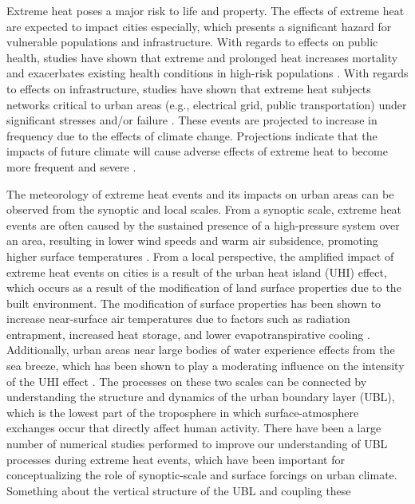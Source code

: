 \documentclass[num-refs]{wiley-article}
\begin{document}
Extreme heat poses a major risk to life and property. The effects of extreme heat are expected to impact cities especially, which presents a significant hazard for vulnerable populations and infrastructure. With regards to effects on public health, studies have shown that extreme and prolonged heat increases mortality and exacerbates existing health conditions in high-risk populations \citep{anderson2011, frumkin2016, heaviside2017, madrigano2015}. With regards to effects on infrastructure, studies have shown that extreme heat subjects networks critical to urban areas (e.g., electrical grid, public transportation) under significant stresses and/or failure \citep{mcevoy2012, zuo2015}. These events are projected to increase in frequency due to the effects of climate change. Projections indicate that the impacts of future climate will cause adverse effects of extreme heat to become more frequent and severe \citep{burillo2019, forzieri2018, peng2011}.

The meteorology of extreme heat events and its impacts on urban areas can be observed from the synoptic and local scales. From a synoptic scale, extreme heat events are often caused by the sustained presence of a high-pressure system over an area, resulting in lower wind speeds and warm air subsidence, promoting higher surface temperatures \citep{black2004, miralles2014}. From a local perspective, the amplified impact of extreme heat events on cities is a result of the urban heat island (UHI) effect, which occurs as a result of the modification of land surface properties due to the built environment. The modification of surface properties has been shown to increase near-surface air temperatures due to factors such as radiation entrapment, increased heat storage, and lower evapotranspirative cooling \citep{chen2014, li2013, ramamurthy2017, zhao2018}. Additionally, urban areas near large bodies of water experience effects from the sea breeze, which has been shown to play a moderating influence on the intensity of the UHI effect \citep{hu2016, jiang2019, stefanon2014}. The processes on these two scales can be connected by understanding the structure and dynamics of the urban boundary layer (UBL), which is the lowest part of the troposphere in which surface-atmosphere exchanges occur that directly affect human activity. There have been a large number of numerical studies performed to improve our understanding of UBL processes during extreme heat events, which have been important for conceptualizing the role of synoptic-scale and surface forcings on urban climate. Something about the vertical structure of the UBL and coupling these
\end{document}

